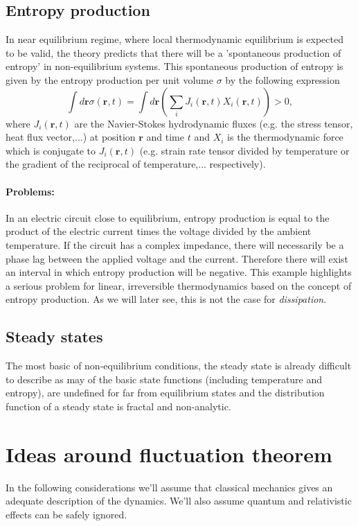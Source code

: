 \documentclass[a4paper,12pt,nofootinbib]{article}
\begin{document}
\subsection{Entropy production}

In near equilibrium regime, where local thermodynamic equilibrium is expected to be valid, the theory predicts that there will be a 'spontaneous production of entropy' in non-equilibrium systems.
This spontaneous production of entropy is given by the entropy production per unit volume $\sigma$ by the following expression \cite{DeGroot:1984ue}
\begin{displaymath}
  \int d\bm{r} \sigma(\bm{r},t)=\int d\bm{r}(\sum_i J_i(\bm{r},t)X_i(\bm{r},t))>0,
\end{displaymath}
where $J_i(\bm{r},t)$ are the Navier-Stokes hydrodynamic fluxes (e.g. the stress tensor, heat flux vector,...) at position $\bm{r}$ and time $t$ and $X_i$ is the thermodynamic force which is conjugate to $J_i(\bm{r},t)$ (e.g. strain rate tensor divided by temperature or the gradient of the reciprocal of temperature,... respectively).

\paragraph{Problems:}
In an electric circuit close to equilibrium, entropy production is equal to the product of the electric current times the voltage divided by the ambient temperature. If the circuit has a complex impedance, there will necessarily be a phase lag between the applied voltage and the current. Therefore there will exist an interval in which entropy production will be negative. 
This example highlights a serious problem for linear, irreversible thermodynamics based on the concept of entropy production. As we will later see, this is not the case for \textit{dissipation}.
\subsection{Steady states}
The most basic of non-equilibrium conditions, the steady state is already difficult to describe as may of the basic state functions (including temperature and entropy), are undefined for far from equilibrium states and the distribution function of a steady state is fractal and non-analytic. 


\section{Ideas around fluctuation theorem}
In the following considerations we'll assume that classical mechanics gives an adequate description of the dynamics.
We'll also assume quantum and relativistic effects can be safely ignored.
\end{document}

